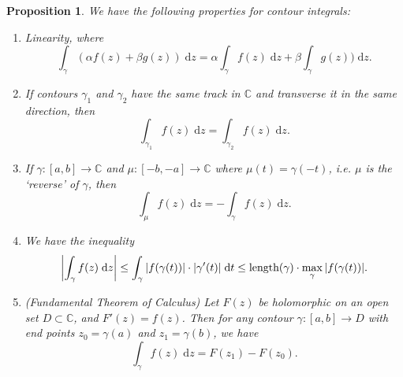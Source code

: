 \documentclass[letter-paper]{tufte-book}
\newtheorem{proposition}[theorem]{\color{pastel-blue}Proposition}
\begin{document}
\begin{proposition}
  We have the following properties for contour integrals:
  \begin{enumerate}
    \item Linearity, where
    \begin{equation*}
      \int_\gamma (\alpha f(z) + \beta g(z))\; \mathrm{d}z = \alpha \int_\gamma f(z)\; \mathrm{d}z + \beta \int_\gamma g(z))\; \mathrm{d}z.
    \end{equation*}
    
    \item If contours $\gamma_1$ and $\gamma_2$ have the same track in
    $\mathbb{C}$ and transverse it in the same direction, then
    \begin{equation*}
      \int_{\gamma_1} f(z)\; \mathrm{d}z = \int_{\gamma_2} f(z)\; \mathrm{d}z.
    \end{equation*}
    
    \item If $\gamma : [a,b] \to \mathbb{C}$ and $\mu : [-b, -a] \to \mathbb{C}$
    where $\mu(t) = \gamma(-t)$, i.e. $\mu$ is the `reverse' of $\gamma$, then
    \begin{equation*}
      \int_{\mu} f(z)\; \mathrm{d}z = -\int_{\gamma} f(z)\; \mathrm{d}z.
    \end{equation*}
    
    \item We have the inequality
    \begin{equation*}
      \left|\int_\gamma f(z)\; \mathrm{d}z\right| \leq \int_\gamma |f(\gamma(t))| \cdot |\gamma'(t)|\; \mathrm{d}t \leq \textnormal{length}(\gamma) \cdot \max_{\gamma} |f(\gamma(t))|.
    \end{equation*}
    
    \item (Fundamental Theorem of Calculus) Let $F(z)$ be holomorphic on an open
    set $D \subset \mathbb{C}$, and $F'(z) = f(z)$. Then for any contour $\gamma
    : [a,b] \to D$ with end points $z_0 = \gamma(a)$ and $z_1 = \gamma(b)$, we
    have
    \begin{equation*}
      \int_\gamma f(z)\; \mathrm{d}z = F(z_1) - F(z_0).
    \end{equation*}
  \end{enumerate}
\end{proposition}
\end{document}
